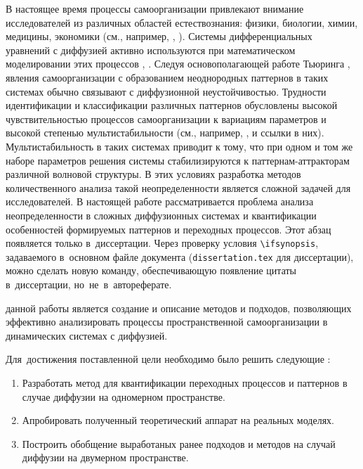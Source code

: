 
{\actuality} 
\ifsynopsis
В настоящее время процессы самоорганизации привлекают внимание исследователей из различных областей естествознания: физики, биологии, химии, медицины, экономики (см., например, \cite{field1985oscillations}, \cite{kuramoto1984chemical}). Системы дифференциальных уравнений с диффузией активно используются при математическом моделировании этих процессов \cite{hoyle2006pattern}, \cite{cross2009pattern}. Следуя основополагающей работе Тьюринга \cite{turing1990chemical}, явления самоорганизации с образованием неоднородных паттернов в таких системах обычно связывают с диффузионной неустойчивостью. Трудности идентификации и классификации различных паттернов обусловлены высокой чувствительностью процессов самоорганизации к вариациям параметров и высокой степенью мультистабильности (см., например, \cite{kolinichenko2020multistability}, \cite{bib4} и ссылки в них). Мультистабильность в таких системах приводит к тому, что при одном и том же наборе параметров решения системы стабилизируются к паттернам-аттракторам различной волновой структуры. В этих условиях разработка методов количественного анализа такой неопределенности является сложной задачей для исследователей. В настоящей работе рассматривается проблема анализа неопределенности в сложных диффузионных системах и квантификации особенностей формируемых паттернов и переходных процессов.
\else
Этот абзац появляется только в~диссертации.
Через проверку условия \verb!\!\verb!ifsynopsis!, задаваемого в~основном файле
документа (\verb!dissertation.tex! для диссертации), можно сделать новую
команду, обеспечивающую появление цитаты в~диссертации, но~не~в~автореферате.
\fi


{\aim} данной работы является создание и описание методов и подходов, позволяющих эффективно анализировать процессы пространственной самоорганизации в динамических системах с диффузией.

Для~достижения поставленной цели необходимо было решить следующие {\tasks}:
\begin{enumerate}[beginpenalty=10000] %
  \item Разработать метод для квантификации переходных процессов и паттернов в случае диффузии на одномерном пространстве.
  \item Апробировать полученный теоретический аппарат на реальных моделях.
  \item Построить обобщение выработаных ранее подходов и методов на случай диффузии на двумерном пространстве.
\end{enumerate}


